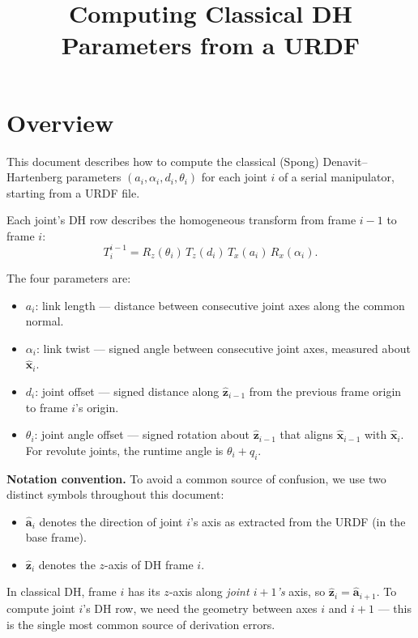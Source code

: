 \documentclass[11pt]{article}
\title{Computing Classical DH Parameters from a URDF}
\author{}
\date{}
\newcommand{\unit}[1]{\hat{\bm{#1}}}
\begin{document}
\maketitle

\section{Overview}

This document describes how to compute the classical (Spong) Denavit--Hartenberg
parameters $(a_i, \alpha_i, d_i, \theta_i)$ for each joint $i$ of a serial
manipulator, starting from a URDF file.

Each joint's DH row describes the homogeneous transform from frame $i{-}1$ to
frame $i$:
\[
  T_i^{i-1} = R_z(\theta_i)\,T_z(d_i)\,T_x(a_i)\,R_x(\alpha_i).
\]

The four parameters are:
\begin{itemize}
  \item $a_i$: link length --- distance between consecutive joint axes along the
    common normal.
  \item $\alpha_i$: link twist --- signed angle between consecutive joint
    axes, measured about $\unit{x}_i$.
  \item $d_i$: joint offset --- signed distance along $\unit{z}_{i-1}$ from the
    previous frame origin to frame $i$'s origin.
  \item $\theta_i$: joint angle offset --- signed rotation about
    $\unit{z}_{i-1}$ that aligns $\unit{x}_{i-1}$ with $\unit{x}_i$. For
    revolute joints, the runtime angle is $\theta_i + q_i$.
\end{itemize}

\begin{warnbox}
\textbf{Notation convention.} To avoid a common source of confusion, we use
two distinct symbols throughout this document:
\begin{itemize}
  \item $\unit{a}_i$ denotes the direction of joint $i$'s axis as extracted
        from the URDF (in the base frame).
  \item $\unit{z}_i$ denotes the $z$-axis of DH frame $i$.
\end{itemize}
In classical DH, frame $i$ has its $z$-axis along \emph{joint $i{+}1$'s} axis,
so $\unit{z}_i = \unit{a}_{i+1}$. To compute joint $i$'s DH row, we need the
geometry between axes $i$ and $i{+}1$ --- this is the single most common
source of derivation errors.
\end{warnbox}
\end{document}

